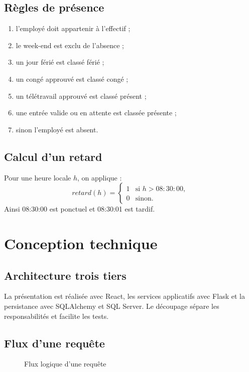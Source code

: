 \documentclass[11pt,a4paper,oneside]{report}
\begin{document}
\section{Règles de présence}
\begin{enumerate}
\item l'employé doit appartenir à l'effectif ;
\item le week-end est exclu de l'absence ;
\item un jour férié est classé férié ;
\item un congé approuvé est classé congé ;
\item un télétravail approuvé est classé présent ;
\item une entrée valide ou en attente est classée présente ;
\item sinon l'employé est absent.
\end{enumerate}
\section{Calcul d'un retard}
Pour une heure locale $h$, on applique :
\[
retard(h)=\begin{cases}1 & \text{si }h>08{:}30{:}00,\\0 & \text{sinon.}\end{cases}
\]
Ainsi 08:30:00 est ponctuel et 08:30:01 est tardif.

\chapter{Conception technique}
\section{Architecture trois tiers}
La présentation est réalisée avec React, les services applicatifs avec Flask et la persistance avec SQLAlchemy et SQL Server. Le découpage sépare les responsabilités et facilite les tests.
\section{Flux d'une requête}
\begin{figure}[H]\centering
{}\caption{Flux logique d'une requête}
\end{figure}
\end{document}
